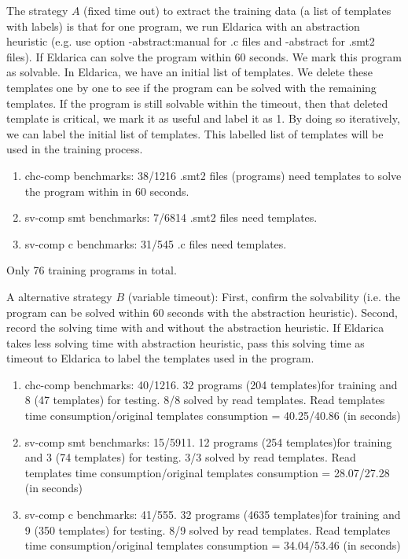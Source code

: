 \documentclass{article}
\begin{document}
The strategy $A$ (fixed time out) to extract the training data (a list of templates with labels) is that for one program, we run Eldarica with an abstraction heuristic (e.g. use option -abstract:manual for .c files and -abstract for .smt2 files). If Eldarica can solve the program within 60 seconds. We mark this program as solvable. In Eldarica, we have an initial list of templates. We delete these templates one by one to see if the program can be solved with the remaining templates. If the program is still solvable within the timeout, then that deleted template is critical, we mark it as useful and label it as 1. By doing so iteratively, we can label the initial list of templates. This labelled list of templates will be used in the training process.

\begin{enumerate}
  \item chc-comp benchmarks: 38/1216 .smt2 files (programs) need templates to solve the program within in 60 seconds.
  \item sv-comp smt benchmarks: 7/6814 .smt2 files need templates.
  \item sv-comp c benchmarks: 31/545 .c files need templates.
\end{enumerate}

Only 76 training programs in total.

A alternative strategy $B$ (variable timeout): First, confirm the solvability (i.e. the program can be solved within 60 seconds with the abstraction heuristic).
Second, record the solving time with and without the abstraction heuristic. If Eldarica takes less solving time with abstraction heuristic, pass this solving time as timeout to Eldarica to label the templates used in the program.

\begin{enumerate}
  \item chc-comp benchmarks: 40/1216.  32 programs (204 templates)for training and 8 (47 templates) for testing. 8/8 solved by read templates. Read templates time consumption/original templates consumption =  40.25/40.86 (in seconds)
  \item sv-comp smt benchmarks: 15/5911.  12 programs (254 templates)for training and 3 (74 templates) for testing. 3/3 solved by read templates. Read templates time consumption/original templates consumption =  28.07/27.28 (in seconds)
  \item sv-comp c benchmarks: 41/555.  32 programs (4635 templates)for training and 9 (350 templates) for testing. 8/9 solved by read templates. Read templates time consumption/original templates consumption = 34.04/53.46  (in seconds)
\end{enumerate}
\end{document}
